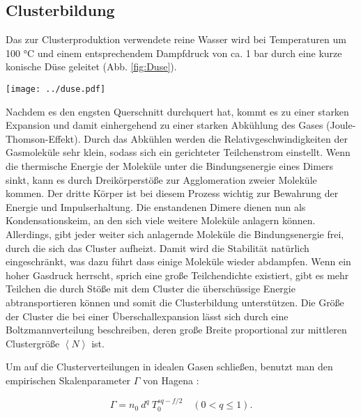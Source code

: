 \subsection{Clusterbildung}

Das zur Clusterproduktion verwendete reine Wasser wird bei Temperaturen um 100 °C und einem entsprechendem Dampfdruck von ca. 1 bar durch eine kurze konische Düse geleitet (Abb. \ref{fig:Duse}).

\begin{center}
\begin{minipage}{\linewidth}
\centering
\texttt{[image: ../duse.pdf]}%
 \label{fig:Duse}
\end{minipage} 
\end{center} 

Nachdem es den engsten Querschnitt durchquert hat, kommt es zu einer starken Expansion und damit einhergehend zu einer starken Abkühlung des Gases (Joule-Thomson-Effekt). Durch das Abkühlen werden die Relativgeschwindigkeiten der Gasmoleküle sehr klein, sodass sich ein gerichteter Teilchenstrom einstellt. Wenn die thermische Energie der Moleküle unter die Bindungsenergie eines Dimers sinkt, kann es durch Dreikörperstöße zur Agglomeration zweier Moleküle kommen. Der dritte Körper ist bei diesem Prozess wichtig zur Bewahrung der Energie und Impulserhaltung. Die enstandenen Dimere dienen nun als Kondensationskeim, an den sich viele weitere Moleküle anlagern können. Allerdings, gibt jeder weiter sich anlagernde Moleküle die Bindungsenergie frei, durch die sich das Cluster aufheizt. Damit wird die Stabilität natürlich eingeschränkt, was dazu führt dass einige Moleküle wieder abdampfen. Wenn ein hoher Gasdruck herrscht, sprich eine große Teilchendichte existiert, gibt es mehr Teilchen die durch Stöße mit dem Cluster die überschüssige Energie abtransportieren können und somit die Clusterbildung unterstützen.
Die Größe der Cluster die bei einer Überschallexpansion lässt sich durch eine Boltzmannverteilung beschreiben, deren große Breite proportional zur mittleren Clustergröße $\left\langle N \right\rangle$ ist. 

Um auf die Clusterverteilungen in idealen Gasen schließen, benutzt man den empirischen Skalenparameter $\Gamma$ von Hagena \cite{hagena1987}:

\begin{equation} \label{eq:Skalenparameter}
\Gamma = n_0\ d^q\ T_0^{sq - f/2} \quad (0 < q \leq 1).
\end{equation}

